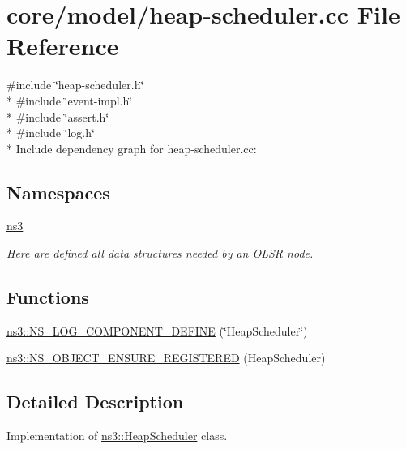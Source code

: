 \hypertarget{heap-scheduler_8cc}{}\section{core/model/heap-\/scheduler.cc File Reference}
\label{heap-scheduler_8cc}
{\ttfamily \#include \char`\"{}heap-\/scheduler.\+h\char`\"{}}\\*
{\ttfamily \#include \char`\"{}event-\/impl.\+h\char`\"{}}\\*
{\ttfamily \#include \char`\"{}assert.\+h\char`\"{}}\\*
{\ttfamily \#include \char`\"{}log.\+h\char`\"{}}\\*
Include dependency graph for heap-\/scheduler.cc\+:
\subsection*{Namespaces}
\begin{DoxyCompactItemize}
\item 
 \hyperlink{namespacens3}{ns3}
\begin{DoxyCompactList}\small\item\em Here are defined all data structures needed by an O\+L\+SR node. \end{DoxyCompactList}\end{DoxyCompactItemize}
\subsection*{Functions}
\begin{DoxyCompactItemize}
\item 
\hyperlink{namespacens3_a3e80f22335d0a5be6f981a52f2815ec3}{ns3\+::\+N\+S\+\_\+\+L\+O\+G\+\_\+\+C\+O\+M\+P\+O\+N\+E\+N\+T\+\_\+\+D\+E\+F\+I\+NE} (\char`\"{}Heap\+Scheduler\char`\"{})
\item 
\hyperlink{namespacens3_ad35c533808bc00f7b703e1eeacc82369}{ns3\+::\+N\+S\+\_\+\+O\+B\+J\+E\+C\+T\+\_\+\+E\+N\+S\+U\+R\+E\+\_\+\+R\+E\+G\+I\+S\+T\+E\+R\+ED} (Heap\+Scheduler)
\end{DoxyCompactItemize}


\subsection{Detailed Description}
Implementation of \hyperlink{classns3_1_1HeapScheduler}{ns3\+::\+Heap\+Scheduler} class. 
